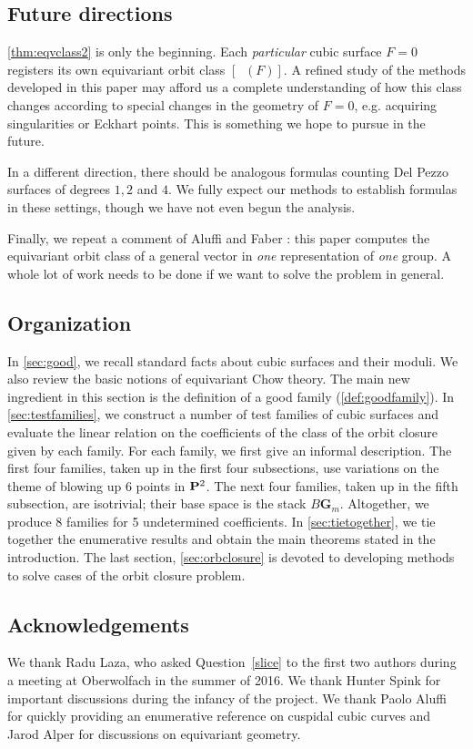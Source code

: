 \documentclass[12pt,reqno]{amsart}
\DeclareMathOperator{\Orb}{\overline{Orb}}
\numberwithin{equation}{section}
\newcommand{\G}{\mathbf G}
\begin{document}
\subsection{Future directions}

\autoref{thm:eqvclass2} is only the beginning.  Each {\sl particular}
cubic surface $F=0$ registers its own equivariant orbit class
$[\Orb(F)]$.  A refined study of the methods developed in this paper
may afford us a complete understanding of how this class changes
according to special changes in the geometry of $F=0$, e.g. acquiring
singularities or Eckhart points.  This is something we hope to pursue
in the future.

In a different direction, there should be analogous formulas counting
Del Pezzo surfaces of degrees $1,2$ and $4$.  We fully expect our
methods to establish formulas in these settings, though we have not
even begun the analysis.

Finally, we repeat a comment of Aluffi and Faber \cite{alu.fab:93}: this paper computes the equivariant orbit class of a general vector in \emph{one} representation of \emph{one} group.  A whole lot of work needs to be done if we want to solve the problem in general.

\subsection{Organization}
In \autoref{sec:good}, we recall standard facts about cubic surfaces and their moduli.
We also review the basic notions of equivariant Chow theory.
The main new ingredient in this section is the definition of a good family (\autoref{def:goodfamily}).
In \autoref{sec:testfamilies}, we construct a number of test families of cubic surfaces and evaluate the linear relation on the coefficients of the class of the orbit closure given by each family.
For each family, we first give an informal description.
The first four families, taken up in the first four subsections, use variations on the theme of blowing up 6 points in $\P^2$.
The next four families, taken up in the fifth subsection, are isotrivial; their base space is the stack $B\G_m$.
Altogether, we produce 8 families for 5 undetermined coefficients.
In \autoref{sec:tietogether}, we tie together the enumerative results and obtain the main theorems stated in the introduction.
The last section, \autoref{sec:orbclosure} is devoted to developing methods to solve cases of the orbit closure problem.

\subsection{Acknowledgements}
We thank Radu Laza, who asked Question~\ref{slice} to the first two
authors during a meeting at Oberwolfach in the summer of 2016.  We
thank Hunter Spink for important discussions during the infancy
of the project.  We thank Paolo Aluffi for quickly providing an
enumerative reference on cuspidal cubic curves and Jarod Alper for discussions on equivariant geometry.
\end{document}
